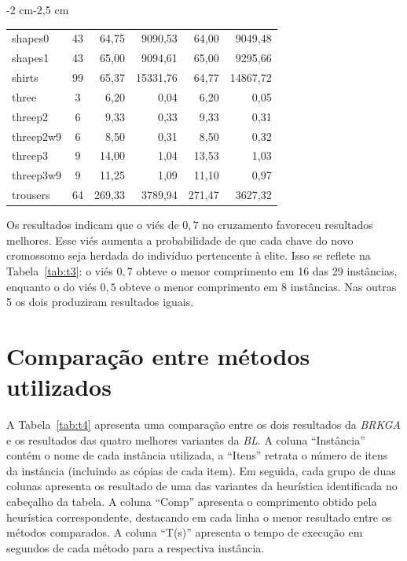 \documentclass{article}
\newcommand{\lgray}{\cellcolor{lightgray}}
\begin{document}
\begin{adjustwidth}{-2 cm}{-2,5 cm}
\begin{threeparttable}[!htb]
{\begin{tabular}{|l|c|rr|rr|}
        shapes0 &43 &64,75 &9090,53 &\lgray64,00 &9049,48 \\
        shapes1 &43 &\lgray65,00 &9094,61 &\lgray65,00 &9295,66 \\
        shirts &99 &65,37 &15331,76 &\lgray64,77 &14867,72 \\
        three &3 &\lgray6,20 &0,04 &\lgray6,20 &0,05 \\
        threep2 &6 &\lgray9,33 &0,33 &\lgray9,33 &0,31 \\
        threep2w9 &6 &\lgray8,50 &0,31 &\lgray8,50 &0,32 \\
        threep3 &9 &14,00 &1,04 &\lgray13,53 &1,03 \\
        threep3w9 &9 &11,25 &1,09 &\lgray11,10 &0,97 \\
        trousers &64 &\lgray269,33 &3789,94 &271,47 &3627,32 \\
        \hline
        \end{tabular}
    }
    \label{tab:t3}
\end{threeparttable}\end{adjustwidth}


\vspace{15pt}


Os resultados indicam que o viés de $0,7$ no cruzamento favoreceu resultados melhores. Esse viés aumenta a probabilidade de que cada chave do novo cromossomo seja herdada do indivíduo pertencente à elite. Isso se reflete na Tabela~\ref{tab:t3}: o viés $0,7$ obteve o menor comprimento em 16 das 29 instâncias, enquanto o do viés $0,5$ obteve o menor comprimento em 8 instâncias. Nas outras 5 os dois produziram resultados iguais.


\section{Comparação entre métodos utilizados} \label{sec:comp}

A Tabela~\ref{tab:t4} apresenta uma comparação entre os dois resultados da {\it BRKGA} e os resultados das quatro melhores variantes da {\it BL}. A coluna ``Instância'' contém o nome de cada instância utilizada, a ``Itens'' retrata o número de itens da instância (incluindo as cópias de cada item). Em seguida, cada grupo de duas colunas apresenta os resultado de uma das variantes da heurística identificada no cabeçalho da tabela. A coluna ``Comp'' apresenta o comprimento obtido pela heurística correspondente, destacando em cada linha o menor resultado entre os métodos comparados. A coluna ``T(s)'' apresenta o tempo de execução em segundos de cada método para a respectiva instância.
\end{document}
